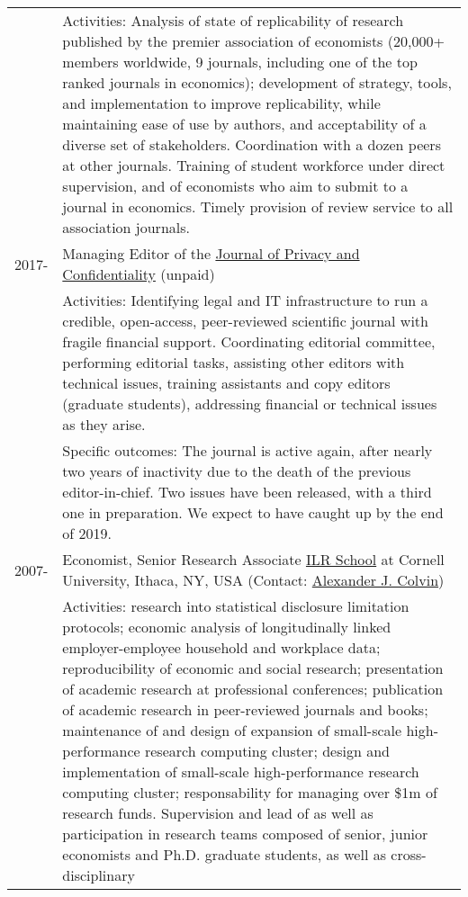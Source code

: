 \documentclass[10pt,letterpaper]{report}
\begin{document}
\begin{longtable}{rp{5in}}
         &Activities: Analysis of state of replicability of research published by the premier association of economists (20,000+ members worldwide, 9 journals, including one of the top ranked journals in economics); development of strategy, tools, and implementation to improve replicability, while maintaining ease of use by authors, and acceptability of a diverse set of stakeholders. Coordination with a dozen peers at other journals. Training of student workforce under direct supervision, and of economists who aim to submit to a journal in economics. Timely provision of review service to all association journals.\\
2017-    & Managing Editor of the \href{http://www.journalprivacyconfidentiality.org}{Journal of Privacy and Confidentiality} (unpaid)\\
         &Activities: Identifying legal and IT infrastructure to run a credible, open-access, peer-reviewed scientific journal with fragile financial support. Coordinating editorial committee, performing editorial tasks, assisting other editors with technical issues, training assistants and copy editors (graduate students), addressing financial or technical issues as they arise.\\
         &Specific outcomes: The journal is active again, after nearly two years of inactivity due to the death of the previous editor-in-chief. Two issues have been released, with a third one in preparation. We expect to have caught up by the end of 2019.\\
2007-    & Economist, Senior Research Associate 
\href{http://www.ilr.cornell.edu}{ILR School} at Cornell University, Ithaca,
NY, USA (Contact:
\href{mailto:ajc22@cornell.edu}{Alexander J. Colvin})\\%
         &Activities: research into statistical
         disclosure limitation protocols; economic analysis of
         longitudinally linked employer-employee household and workplace
         data; reproducibility of economic and social research; presentation of academic research at professional
         conferences; publication of academic research in peer-reviewed
         journals and books; maintenance of and design of expansion of small-scale high-performance
         research computing cluster; design and implementation of small-scale
         high-performance research computing cluster;
         responsability for managing over \$1m of research
         funds. Supervision and lead of as well as participation in research teams composed of senior, junior economists
         and Ph.D. graduate students, as well as cross-disciplinary

\end{longtable}
\end{document}
